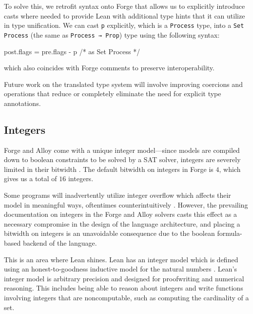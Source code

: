 \begin{center}
\end{center}

To solve this, we retrofit syntax onto Forge that allows us to explicitly introduce casts where needed to provide Lean with additional type hints that it can utilize in type unification. We can cast \texttt{p} explicitly, which is a \texttt{Process} type, into a \texttt{Set Process} (the same as \texttt{Process → Prop}) type using the following syntax: 
\begin{forge*}
post.flags = pre.flags - p /* as Set Process */
\end{forge*}
which also coincides with Forge comments to preserve interoperability. 

Future work on the translated type system will involve improving coercions and operations that reduce or completely eliminate the need for explicit type annotations. 

\subsection{Integers}\label{sec:integers}
Forge and Alloy come with a unique integer model---since models are compiled down to boolean constraints to be solved by a SAT solver, integers are severely limited in their bitwidth \cite{jackson2012software,nelson2024artifact}. The default bitwidth on integers in Forge is $4$, which gives us a total of $16$ integers. 

Some programs will inadvertently utilize integer overflow which affects their model in meaningful ways, oftentimes counterintuitively \cite[22]{ngpdbccdlrrvwwk-oopsla-2024}. However, the prevailing documentation on integers in the Forge and Alloy solvers casts this effect as a necessary compromise in the design of the language architecture, and placing a bitwidth on integers is an unavoidable consequence due to the boolean formula-based backend of the language. 

This is an area where Lean shines. Lean has an integer model which is defined using an honest-to-goodness inductive model for the natural numbers \cite{avigad2024theorem}. Lean's integer model is arbitrary precision and designed for proofwriting and numerical reasoning. This includes being able to reason about integers and write functions involving integers that are noncomputable, such as computing the cardinality of a set. 

